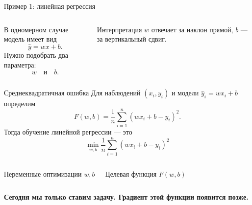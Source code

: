 \documentclass[aspectratio=169,10pt]{beamer}
\begin{document}
\begin{frame}{Пример 1: линейная регрессия}
\begin{columns}[T,onlytextwidth]
В одномерном случае модель имеет вид
\[
  \widehat y=wx+b.
\]
Нужно подобрать два параметра:
\[
  w\quad\text{и}\quad b.
\]
\begin{block}{Интерпретация}
$w$ отвечает за наклон прямой, $b$ --- за вертикальный сдвиг.
\end{block}
\end{columns}
\end{frame}

\begin{frame}{Среднеквадратичная ошибка}
Для наблюдений $(x_i,y_i)$ и модели $\widehat y_i=wx_i+b$ определим
\[
  F(w,b)=\frac{1}{n}\sum_{i=1}^{n}(wx_i+b-y_i)^2.
\]
Тогда обучение линейной регрессии --- это
\[
\boxed{
  \min_{w,b}\frac{1}{n}\sum_{i=1}^{n}(wx_i+b-y_i)^2
}
\]

\begin{columns}[T,onlytextwidth]
\begin{block}{Переменные оптимизации}
\centering $w,b$
\end{block}
\begin{block}{Целевая функция}
\centering $F(w,b)$
\end{block}
\end{columns}
\vfill
\centering \textbf{Сегодня мы только ставим задачу. Градиент этой функции появится позже.}
\end{frame}
\end{document}
